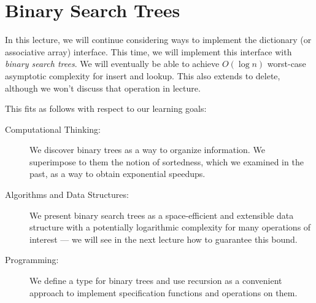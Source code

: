 \chapter{Binary Search Trees}
\label{ch:bst}

\newcommand{\lecnum}{15}
\newcommand{\lecturer}{Frank Pfenning, Andr\'e Platzer, Rob Simmons,
  Iliano Cervesato}

\maketitle

\begin{preamble}
\noindent
In this lecture, we will continue considering ways to implement the
dictionary (or associative array) interface.  This time, we will implement
this interface with \emph{binary search trees}.  We will eventually be
able to achieve $O(\log n)$ worst-case asymptotic complexity for
insert and lookup.  This also extends to delete, although we won't
discuss that operation in lecture.


\end{preamble}

\begin{gram}
This fits as follows with respect to our learning goals:
\begin{description}
\item[Computational Thinking: ]%
  We discover binary trees as a way to organize information.  We superimpose
  to them the notion of sortedness, which we examined in the past, as a way to
  obtain exponential speedups.

\item[Algorithms and Data Structures: ]%
  We present binary search trees as a space-efficient and extensible data
  structure with a potentially logarithmic complexity for many operations of
  interest --- we will see in the next lecture how to guarantee this bound.

\item[Programming: ]%
  We define a type for binary trees and use recursion as a convenient approach
  to implement specification functions and operations on them.
\end{description}
\end{gram}


